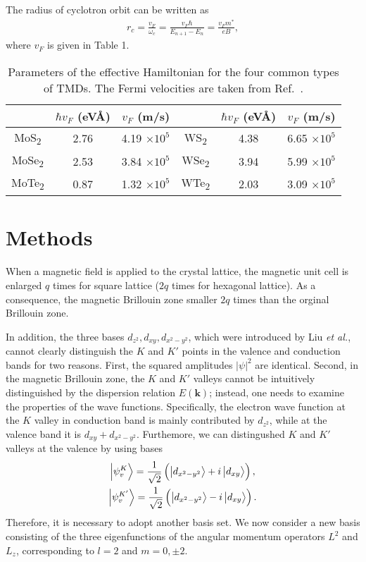 \documentclass{article}
\begin{document}
The radius of cyclotron orbit can be written as
\begin{gather}
	r_{c} = \frac{v_{F}}{\omega_{c}} = \frac{v_{F} \hbar}{E_{n+1} - E_{n}} = \frac{v_{F} m^{*}}{eB},
\end{gather}
where $v_{F}$ is given in Table 1.

\begin{table}[!h]
	\centering
	\renewcommand{\arraystretch}{2.0}
	\begin{tabular}{c c c | c c c}
		\hline\hline
		& $\hbar v_{F}$ (eV\AA) & $v_{F}$ (m/s) & & $\hbar v_{F}$ (eV\AA) & $v_{F}$ (m/s) \\ 
		\hline
		MoS\textsubscript{2}  & 2.76 & 4.19 $\times 10^{5}$ & WS\textsubscript{2}  & 4.38 & 6.65 $\times 10^{5}$ \\ \hline
		MoSe\textsubscript{2} & 2.53 & 3.84 $\times 10^{5}$ & WSe\textsubscript{2} & 3.94 & 5.99 $\times 10^{5}$ \\ \hline
		MoTe\textsubscript{2} & 0.87 & 1.32 $\times 10^{5}$ & WTe\textsubscript{2} & 2.03 & 3.09 $\times 10^{5}$ \\ 
		\hline\hline
	\end{tabular}
	\caption{Parameters of the effective Hamiltonian for the four common types of TMDs. The Fermi velocities are taken from Ref.~\cite{have2019,luo2016}.}
\end{table}

\newpage

\section{Methods}

When a magnetic field is applied to the crystal lattice, the magnetic unit cell is enlarged $q$ times for square lattice ($2q$ times for hexagonal lattice). As a consequence, the magnetic Brillouin zone smaller $2q$ times than the orginal Brillouin zone.

In addition, the three bases $d_{z^{2}}, d_{xy}, d_{x^{2}-y^{2}}$, which were introduced by Liu \textit{et al.}, cannot clearly distinguish the $K$ and $K'$ points in the valence and conduction bands for two reasons. First, the squared amplitudes $|\psi|^{2}$ are identical. Second, in the magnetic Brillouin zone, the $K$ and $K'$ valleys cannot be intuitively distinguished by the dispersion relation $E(\mathbf{k})$; instead, one needs to examine the properties of the wave functions. Specifically, the electron wave function at the $K$ valley in conduction band is mainly contributed by $d_{z^{2}}$, while at the valence band it is $d_{xy} + d_{x^{2}-y^{2}}$. Furthemore, we can distingushed $K$ and $K'$ valleys at the valence by using bases
\begin{gather}
	\ket{\psi_{v}^{K}} = \frac{1}{\sqrt{2}} \left( \ket{d_{x^{2} - y^{2}}} + i \ket{d_{xy}} \right),\\
	\ket{\psi_{v}^{K'}} = \frac{1}{\sqrt{2}} \left( \ket{d_{x^{2} - y^{2}}} - i \ket{d_{xy}} \right).
\end{gather}
Therefore, it is necessary to adopt another basis set. We now consider a new basis consisting of the three eigenfunctions of the angular momentum operators $L^{2}$ and $L_{z}$, corresponding to $l = 2$ and $m = 0, \pm 2$.
\end{document}
